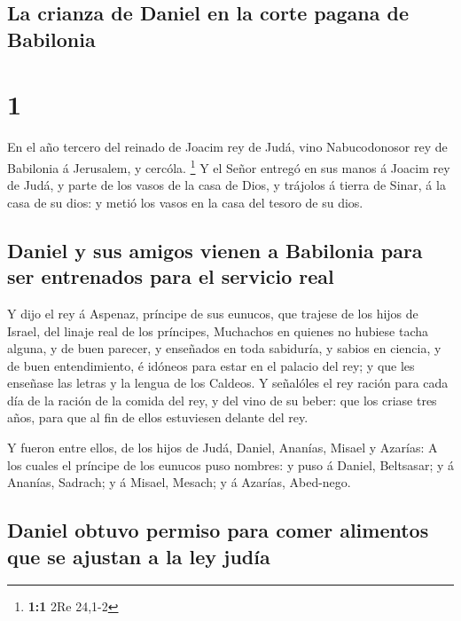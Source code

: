 \hypertarget{la-crianza-de-daniel-en-la-corte-pagana-de-babilonia}{%
\subsection{La crianza de Daniel en la corte pagana de
Babilonia}\label{la-crianza-de-daniel-en-la-corte-pagana-de-babilonia}}

\hypertarget{section}{%
\section{1}\label{section}}

 En el año tercero del reinado de Joacim rey de Judá, vino
Nabucodonosor rey de Babilonia á Jerusalem, y cercóla. \footnote{\textbf{1:1}
  2Re 24,1-2}  Y el Señor entregó en sus manos á Joacim
rey de Judá, y parte de los vasos de la casa de Dios, y trájolos á
tierra de Sinar, á la casa de su dios: y metió los vasos en la casa del
tesoro de su dios.

\hypertarget{daniel-y-sus-amigos-vienen-a-babilonia-para-ser-entrenados-para-el-servicio-real}{%
\subsection{Daniel y sus amigos vienen a Babilonia para ser entrenados
para el servicio
real}\label{daniel-y-sus-amigos-vienen-a-babilonia-para-ser-entrenados-para-el-servicio-real}}

 Y dijo el rey á Aspenaz, príncipe de sus eunucos, que
trajese de los hijos de Israel, del linaje real de los príncipes,
 Muchachos en quienes no hubiese tacha alguna, y de buen
parecer, y enseñados en toda sabiduría, y sabios en ciencia, y de buen
entendimiento, é idóneos para estar en el palacio del rey; y que les
enseñase las letras y la lengua de los Caldeos.  Y
señalóles el rey ración para cada día de la ración de la comida del rey,
y del vino de su beber: que los criase tres años, para que al fin de
ellos estuviesen delante del rey.

 Y fueron entre ellos, de los hijos de Judá, Daniel,
Ananías, Misael y Azarías:  A los cuales el príncipe de
los eunucos puso nombres: y puso á Daniel, Beltsasar; y á Ananías,
Sadrach; y á Misael, Mesach; y á Azarías, Abed-nego.

\hypertarget{daniel-obtuvo-permiso-para-comer-alimentos-que-se-ajustan-a-la-ley-juduxeda}{%
\subsection{Daniel obtuvo permiso para comer alimentos que se ajustan a
la ley
judía}\label{daniel-obtuvo-permiso-para-comer-alimentos-que-se-ajustan-a-la-ley-juduxeda}}

